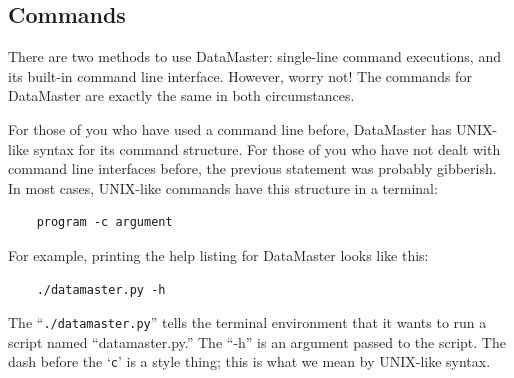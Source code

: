 \documentclass[12pt]{article}
\begin{document}
{
\subsection*{Commands}
\label{subsec:commands}

There are two methods to use DataMaster: single-line command executions, and its built-in command line interface. However, worry not! The commands for DataMaster are exactly the same in both circumstances.

For those of you who have used a command line before, DataMaster has UNIX-like syntax for its command structure. For those of you who have not dealt with command line interfaces before, the previous statement was probably gibberish. In most cases, UNIX-like commands have this structure in a terminal:
\begin{framed}
  \begin{lstlisting}
    program -c argument
  \end{lstlisting}
\end{framed}
For example, printing the help listing for DataMaster looks like this:
\begin{framed}
  \begin{lstlisting}
    ./datamaster.py -h
  \end{lstlisting}
\end{framed}
The ``\texttt{./datamaster.py}'' tells the terminal environment that it wants to run a script named ``datamaster.py.'' The ``-h'' is an argument passed to the script. The dash before the `\texttt{c}' is a style thing; this is what we mean by UNIX-like syntax.

}
\end{document}
